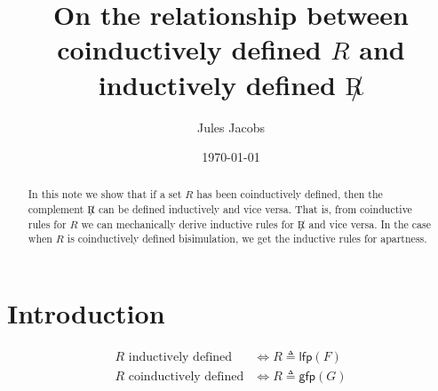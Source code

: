
\newcommand{\id}[1]{\lstinline\|#1\|}

\title{On the relationship between coinductively defined $R$ and inductively defined $\not R$}
\author{\large{Jules Jacobs}}
\date{\normalsize	\today}


\maketitle

\begin{abstract}
  In this note we show that if a set $R$ has been coinductively defined, then the complement $\not R$ can be defined inductively and vice versa.
  That is, from coinductive rules for $R$ we can mechanically derive inductive rules for $\not R$ and vice versa.
  In the case when $R$ is coinductively defined bisimulation, we get the inductive rules for apartness.
\end{abstract}

\section{Introduction}

\newcommand{\lfp}{\mathsf{lfp}}
\newcommand{\gfp}{\mathsf{gfp}}

\begin{align*}
  R \text{ inductively defined} & \iff R \triangleq \lfp(F) \\
  R \text{ coinductively defined} & \iff R \triangleq \gfp(G)
\end{align*}

\cite{owens_reppy_turon_2009}





